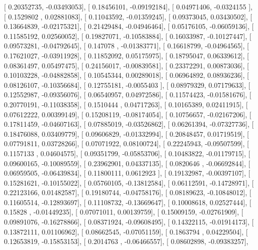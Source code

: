 \documentclass{article}
\begin{document}
       [ 0.20352735, -0.03493053],
       [ 0.18456101, -0.09192184],
       [ 0.04971406, -0.0324155 ],
       [ 0.1529802 ,  0.02881083],
       [ 0.11043592, -0.01359245],
       [ 0.09373045,  0.03430502],
       [ 0.13664839, -0.02175321],
       [ 0.21429484, -0.04946464],
       [ 0.05176105, -0.06059136],
       [ 0.11585192,  0.02560052],
       [ 0.19827071, -0.10583884],
       [ 0.16033987, -0.10127447],
       [ 0.09573281, -0.04792645],
       [ 0.147078  , -0.01383771],
       [ 0.16618799, -0.04964565],
       [ 0.17621027, -0.03911928],
       [ 0.11852092,  0.05175975],
       [ 0.18795047,  0.06339612],
       [ 0.08361497,  0.05497475],
       [ 0.24156017, -0.00839581],
       [ 0.23372291,  0.00873036],
       [ 0.10103228, -0.04882858],
       [ 0.10545344,  0.00289018],
       [ 0.06964892,  0.08936236],
       [ 0.08126107, -0.10356684],
       [ 0.12755181, -0.0055403 ],
       [ 0.08979329,  0.07179633],
       [ 0.12552987, -0.09356076],
       [ 0.06540957,  0.04972586],
       [ 0.11574423, -0.01581676],
       [ 0.20770191, -0.11038358],
       [ 0.1510444 ,  0.04717263],
       [ 0.10165389,  0.02411915],
       [ 0.07612222,  0.00399149],
       [ 0.15208119, -0.08174054],
       [ 0.10756657, -0.02167206],
       [ 0.17811459, -0.04607163],
       [ 0.07885019, -0.03526862],
       [ 0.06261394, -0.07327736],
       [ 0.18476088,  0.03409779],
       [ 0.09606829, -0.01332994],
       [ 0.20848457,  0.01719519],
       [ 0.07791811,  0.03728266],
       [ 0.07071922,  0.08100724],
       [ 0.22245943, -0.09507599],
       [ 0.1157133 ,  0.04604575],
       [ 0.09351799, -0.05853706],
       [ 0.10483822, -0.01179715],
       [ 0.09600165, -0.10089559],
       [ 0.23962901,  0.04337135],
       [ 0.0820646 , -0.06692844],
       [ 0.06959505, -0.06439834],
       [ 0.11800111,  0.0612923 ],
       [ 0.19132987, -0.00397107],
       [ 0.15281621, -0.10155022],
       [ 0.05760105, -0.13812584],
       [ 0.06112591, -0.14728971],
       [ 0.22123166,  0.01482587],
       [ 0.19180744, -0.04758176],
       [ 0.08189623, -0.10848012],
       [ 0.11605514, -0.12893697],
       [ 0.11108732, -0.13669647],
       [ 0.10008618,  0.02527444],
       [ 0.15828   , -0.01449235],
       [ 0.07071011,  0.00139759],
       [ 0.15009159, -0.02761909],
       [ 0.09891076, -0.16278866],
       [ 0.08371924, -0.09608495],
       [ 0.14322115, -0.01914173],
       [ 0.13872111,  0.01106962],
       [ 0.08662545, -0.07051159],
       [ 0.1863794 ,  0.04229504],
       [ 0.12653819, -0.15853153],
       [ 0.2014763 , -0.06466557],
       [ 0.08602898, -0.09383257],
\end{document}
